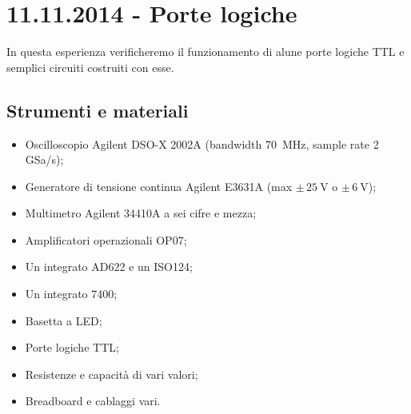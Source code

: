 \section{11.11.2014 - Porte logiche}

In questa esperienza verificheremo il funzionamento di alune porte logiche TTL e semplici circuiti costruiti con esse.

\subsection*{Strumenti e materiali}

\begin{itemize} [noitemsep]
	\item Oscilloscopio Agilent DSO-X 2002A (bandwidth \SI{70}{\mega\hertz}, sample rate \num{2} GSa/s);%
		\item Generatore di tensione continua Agilent E3631A (max $\pm \, \SI{25}{\volt}$ o $\pm \, \SI{6}{\volt}$);
		\item Multimetro Agilent 34410A a sei cifre e mezza;
		\item Amplificatori operazionali OP07;
		\item Un integrato AD622 e un ISO124;
		\item Un integrato 7400;
		\item Basetta a LED;
		\item Porte logiche TTL;		
		\item Resistenze e capacità di vari valori;
		\item Breadboard e cablaggi vari.
\end{itemize}


